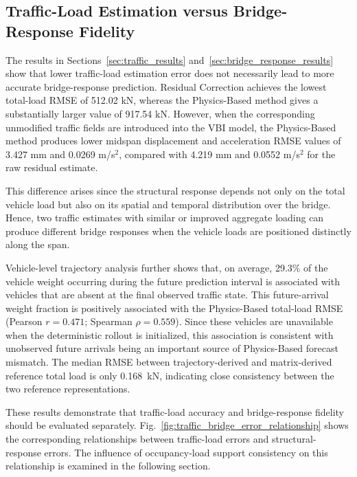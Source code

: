 \documentclass[journal]{IEEEtran}
\begin{document}
\subsection{Traffic-Load Estimation versus Bridge-Response Fidelity}
\label{sec:load_response_fidelity}

The results in Sections~\ref{sec:traffic_results} and~\ref{sec:bridge_response_results} show that lower traffic-load estimation error does not necessarily
lead to more accurate bridge-response prediction. Residual Correction achieves
the lowest total-load RMSE of 512.02 kN, whereas the Physics-Based method gives
a substantially larger value of 917.54 kN. However, when the corresponding
unmodified traffic fields are introduced into the VBI model, the Physics-Based
method produces lower midspan displacement and acceleration RMSE values of
3.427 mm and 0.0269 m/s$^2$, compared with 4.219 mm and 0.0552 m/s$^2$ for the raw
residual estimate.

This difference arises since
the structural response depends not only on the total vehicle load but also on
its spatial and temporal distribution over the bridge. Hence, two traffic
estimates with similar or improved aggregate loading can produce different
bridge responses when the vehicle loads are positioned distinctly along the
span.

{\color{blue}Vehicle-level trajectory analysis further shows that, on average, 29.3\% of the vehicle weight occurring during the future prediction interval is associated with vehicles that are absent at the final observed traffic state. This future-arrival weight fraction is positively associated with the Physics-Based total-load RMSE (Pearson $r=0.471$; Spearman $\rho=0.559$). Since these vehicles are unavailable when the deterministic rollout is initialized, this association is consistent with unobserved future arrivals being an important source of Physics-Based forecast mismatch. The median RMSE between trajectory-derived and matrix-derived reference total load is only 0.168~kN, indicating close consistency between the two reference representations.}

These results demonstrate that traffic-load accuracy and bridge-response fidelity should be evaluated separately. Fig.~\ref{fig:traffic_bridge_error_relationship} shows the corresponding relationships between traffic-load errors and structural-response errors. The influence of occupancy-load support consistency on this
relationship is examined in the following section.
\end{document}
